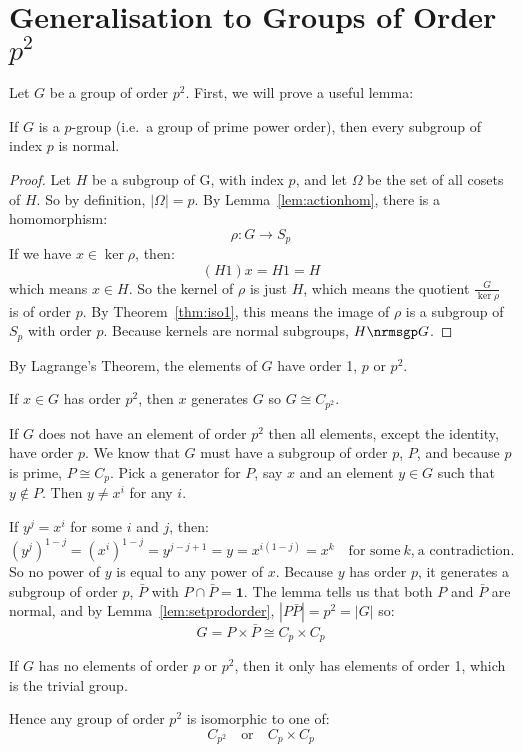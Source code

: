 \section{Generalisation to Groups of Order \(p^2\)}
Let \(G\) be a group of order \(p^2\).
First, we will prove a useful lemma:

\begin{lemma}
    If \(G\) is a \(p\)-group (i.e.\ a group of prime power order), then every subgroup of index \(p\) is normal.
\end{lemma}

\begin{proof}
    Let \(H\) be a subgroup of G, with index \(p\), and let \(\Omega\) be the set of all cosets of \(H\).
    So by definition, \(|\Omega| = p\).
    By Lemma~\ref{lem:actionhom}, there is a homomorphism:
    \[\rho:G \to S_p\]
    If we have \(x \in \ker{\rho}\), then:
    \[(H1)x = H1 = H\]
    which means \(x \in H\).
    So the kernel of \(\rho\) is just \(H\), which means the quotient \(\frac{G}{\ker{\rho}}\) is of order \(p\).
    By Theorem~\ref{thm:iso1}, this means the image of \(\rho\) is a subgroup of \(S_p\) with order \(p\).
    Because kernels are normal subgroups, \(H \nrmsgp G\).  %
\end{proof}


By Lagrange's Theorem, the elements of \(G\) have order 1, \(p\) or \(p^2\).

If \(x \in G\) has order \(p^2\), then \(x\) generates \(G\) so \(G \cong C_{p^2}\).

If \(G\) does not have an element of order \(p^2\) then all elements, except the identity, have order \(p\).
We know that \(G\) must have a subgroup of order \(p\), \(P\), and because \(p\) is prime, \(P \cong C_p\).
Pick a generator for \(P\), say \(x\) and an element \(y \in G\) such that \(y \notin P\).
Then \(y \neq x^i\) for any \(i\).

If \(y^j = x^i\) for some \(i\) and \(j\), then:
\[{(y^j)}^{1-j} = {(x^i)}^{1-j} = y^{j-j+1} = y = x^{i(1-j)} = x^k \quad \text{for some} \ k\text{,} \ \text{a
contradiction.}\]
So no power of \(y\) is equal to any power of \(x\).
Because \(y\) has order \(p\), it generates a subgroup of order \(p\), \(\bar{P}\) with \(P \cap \bar{P} = \bm{1}\).
The lemma tells us that both \(P\) and \(\bar{P}\) are normal, and by Lemma~\ref{lem:setprodorder}, \(|P\bar{P}| = p^2 =
|G|\) so:
\[G = P \times \bar{P} \cong C_p \times C_p\]

If \(G\) has no elements of order \(p\) or \(p^2\), then it only has elements of order 1, which is the trivial group.

Hence any group of order \(p^2\) is isomorphic to one of:
\[C_{p^2} \quad \text{or} \quad C_p \times C_p\]


